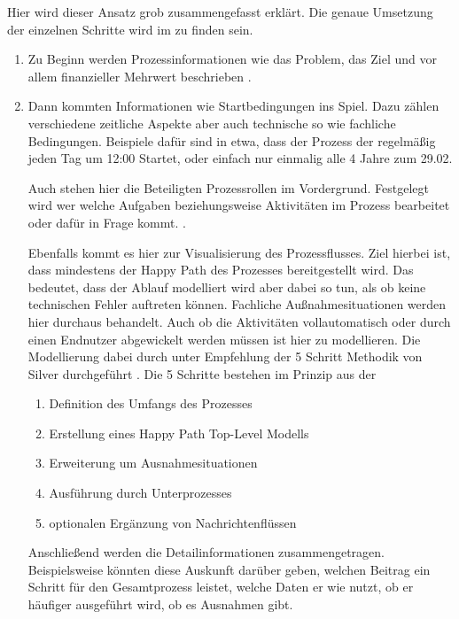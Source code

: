 Hier wird dieser Ansatz grob zusammengefasst erklärt. Die genaue Umsetzung der einzelnen Schritte wird im  zu finden sein.
\begin{enumerate}
    \item Zu Beginn werden Prozessinformationen wie das Problem, das Ziel und vor allem finanzieller Mehrwert beschrieben \citep[vgl.][S. 60]{stiehl_prozessgesteuerte_2013}.
    
    \item \label{enu:item:spezifikation_von_prozessgesteuerten_anwendungen:prozessmodellierung} Dann kommten Informationen wie Startbedingungen ins Spiel. Dazu zählen verschiedene zeitliche Aspekte aber auch technische so wie fachliche Bedingungen. Beispiele dafür sind in etwa, dass der Prozess der regelmäßig jeden Tag um 12:00 Startet, oder einfach nur einmalig alle 4 Jahre zum 29.02. \cite[vgl.][S. 61f]{stiehl_prozessgesteuerte_2013}
    
    Auch stehen hier die Beteiligten Prozessrollen im Vordergrund. Festgelegt wird wer welche Aufgaben beziehungsweise Aktivitäten im Prozess bearbeitet oder dafür in Frage kommt. \citep[vgl.][S. 62]{stiehl_prozessgesteuerte_2013}.
    
    Ebenfalls kommt es hier zur Visualisierung des Prozessflusses. Ziel hierbei ist, dass mindestens der Happy Path des Prozesses bereitgestellt wird. Das bedeutet, dass der Ablauf modelliert wird aber dabei so tun, als ob keine technischen Fehler auftreten können. Fachliche Außnahmesituationen werden hier durchaus behandelt. Auch ob die Aktivitäten vollautomatisch oder durch einen Endnutzer abgewickelt werden müssen ist hier zu modellieren. Die Modellierung dabei durch unter Empfehlung der 5 Schritt Methodik von Silver durchgeführt \cite[vgl.][S. 67-75]{bruce_bpmn_2012}. Die 5 Schritte bestehen im Prinzip aus der
    \begin{enumerate}
        \item Definition des Umfangs des Prozesses
        \item Erstellung eines Happy Path Top-Level Modells
        \item Erweiterung um Ausnahmesituationen
        \item Ausführung durch Unterprozesses
        \item optionalen Ergänzung von Nachrichtenflüssen
    \end{enumerate}
    \cite[vgl.][S. 63ff]{stiehl_prozessgesteuerte_2013}
    
    Anschließend werden die Detailinformationen zusammengetragen. Beispielsweise könnten diese Auskunft darüber geben, welchen Beitrag ein Schritt für den Gesamtprozess leistet, welche Daten er wie nutzt, ob er häufiger ausgeführt wird, ob es Ausnahmen gibt. \cite[vgl.][S. 66f]{stiehl_prozessgesteuerte_2013} 
    

\end{enumerate}
